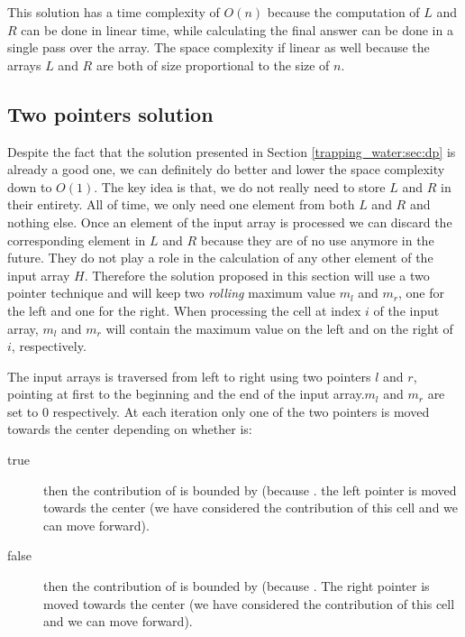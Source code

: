 \begin{figure}
\end{figure}




This solution has a time complexity of $O(n)$ because the computation of $L$ and $R$ can be done in linear time, while calculating the final answer can be done in a single pass over the array. The space complexity if linear as well because the arrays $L$ and $R$ are both of size proportional to the size of $n$.


\subsection{Two pointers solution}
\label{trapping_water:sec:two_pointers}
Despite the fact that the solution presented in Section \ref{trapping_water:sec:dp} is already a good one, we can definitely do better and lower the space complexity down to $O(1)$. The key idea is that, we do not really need to store $L$ and $R$ in their entirety. All of time, we only need one element from both $L$ and $R$ and nothing else. Once an element of the input array is processed we can discard the corresponding element in $L$ and $R$ because they are of no use anymore in the future. They do not play a role in the calculation of any other element of the input array $H$. Therefore the solution proposed in this section will use a two pointer technique and will keep two \textit{rolling} maximum value $m_l$ and $m_r$, one for the left and one for the right. When processing the cell at index $i$ of the input array, $m_l$ and $m_r$ will contain the maximum value on the left  and on the right of $i$, respectively.

The input arrays is traversed from left to right using two pointers $l$ and $r$, pointing at first to the beginning and the end of the input array.$m_l$ and $m_r$ are set to $0$ respectively. At each iteration only one of the two pointers is moved towards the center depending on whether  is:
\begin{description}
\item[true]  then the contribution of  is bounded by  (because . the left pointer is moved towards the center (we have considered the contribution of this cell and we can move forward).\\
\item[false] then the contribution of  is bounded by  (because . The right pointer is moved towards the center (we have considered the contribution of this cell and we can move forward). \\
\end{description}

